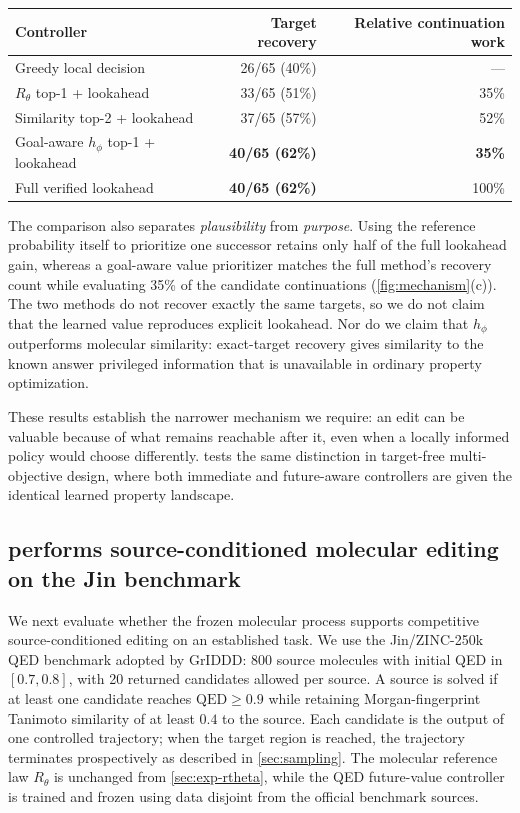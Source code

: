 \begin{center}
{\small
\begin{tabular}{lrr}
\toprule
Controller & Target recovery & Relative continuation work \\
\midrule
Greedy local decision & 26/65 (40\%) & --- \\
$R_\theta$ top-1 + lookahead & 33/65 (51\%) & 35\% \\
Similarity top-2 + lookahead & 37/65 (57\%) & 52\% \\
Goal-aware $h_\phi$ top-1 + lookahead & \textbf{40/65 (62\%)} & \textbf{35\%} \\
Full verified lookahead & \textbf{40/65 (62\%)} & 100\% \\
\bottomrule
\end{tabular}}
\end{center}

The comparison also separates \emph{plausibility} from \emph{purpose}. Using the reference probability itself to prioritize one successor retains only half of the full lookahead gain, whereas a goal-aware value prioritizer matches the full method's recovery count while evaluating 35\% of the candidate continuations (\cref{fig:mechanism}(c)). The two methods do not recover exactly the same targets, so we do not claim that the learned value reproduces explicit lookahead. Nor do we claim that $h_\phi$ outperforms molecular similarity: exact-target recovery gives similarity to the known answer privileged information that is unavailable in ordinary property optimization.

These results establish the narrower mechanism we require: an edit can be valuable because of what remains reachable after it, even when a locally informed policy would choose differently.  tests the same distinction in target-free multi-objective design, where both immediate and future-aware controllers are given the identical learned property landscape.

\subsection{\method{} performs source-conditioned molecular editing on the Jin benchmark}
\label{sec:exp-jin}

We next evaluate whether the frozen \method{} molecular process supports competitive source-conditioned editing on an established task. We use the Jin/ZINC-250k QED benchmark adopted by GrIDDD: 800 source molecules with initial QED in $[0.7,0.8]$, with 20 returned candidates allowed per source. A source is solved if at least one candidate reaches $\mathrm{QED}\ge0.9$ while retaining Morgan-fingerprint Tanimoto similarity of at least $0.4$ to the source. Each \method{} candidate is the output of one controlled trajectory; when the target region is reached, the trajectory terminates prospectively as described in \cref{sec:sampling}. The molecular reference law $R_\theta$ is unchanged from \cref{sec:exp-rtheta}, while the QED future-value controller is trained and frozen using data disjoint from the official benchmark sources.

